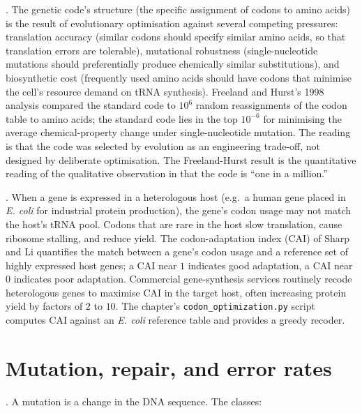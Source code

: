 . The genetic code's structure (the
specific assignment of codons to amino acids) is the result of
evolutionary optimisation against several competing pressures:
translation accuracy (similar codons should specify similar amino
acids, so that translation errors are tolerable), mutational
robustness (single-nucleotide mutations should preferentially produce
chemically similar substitutions), and biosynthetic cost (frequently
used amino acids should have codons that minimise the cell's resource
demand on tRNA synthesis). Freeland and Hurst's 1998 analysis
\cite{paper:v6c03-freeland-hurst-1998} compared the standard code to
$10^6$ random reassignments of the codon table to amino acids; the
standard code lies in the top $10^{-6}$ for minimising the average
chemical-property change under single-nucleotide mutation. The
reading is that the code was selected by evolution as an engineering
trade-off, not designed by deliberate optimisation. The Freeland-Hurst
result is the quantitative reading of the qualitative observation in
\cite[ch.~27]{text:lehninger-biochemistry} that the code is
``one in a million.''

. When a gene is
expressed in a heterologous host (e.g.\ a human gene placed in
\emph{E. coli} for industrial protein production), the gene's codon
usage may not match the host's tRNA pool. Codons that are rare in the
host slow translation, cause ribosome stalling, and reduce yield.
The codon-adaptation index (CAI) of Sharp and Li
\cite{paper:v6c03-sharp-li-1987} quantifies the match between a gene's
codon usage and a reference set of highly expressed host genes; a CAI
near $1$ indicates good adaptation, a CAI near $0$ indicates poor
adaptation. Commercial gene-synthesis services routinely recode
heterologous genes to maximise CAI in the target host, often
increasing protein yield by factors of $2$ to $10$. The chapter's
\texttt{codon\_optimization.py} script computes CAI against an
\emph{E. coli} reference table and provides a greedy recoder.

\section{Mutation, repair, and error rates}

. A mutation is a change in the DNA sequence. The
classes:

